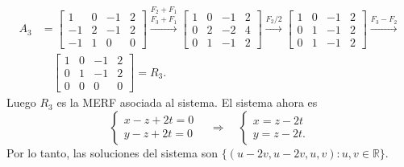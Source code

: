 \begin{enumerate}[topsep=6pt, itemsep=.4cm]
\begin{align*}
A_3 &= \begin{bmatrix}
 1&0&-1&2\\
 -1&2&-1&2\\
 -1&1&0&0\end{bmatrix} \stackrel{F_2+F_1}{\stackrel{F_3+F_1}{\longrightarrow}}   
 \begin{bmatrix}
 1&0&-1&2\\
 0&2&-2&4\\
 0&1&-1&2\end{bmatrix}{\stackrel{F_2/2}{\longrightarrow}}   
 \begin{bmatrix}
 1&0&-1&2\\
 0&1&-1&2\\
 0&1&-1&2\end{bmatrix}{\stackrel{F_3-F_2}{\longrightarrow}}  \\
 &\quad
 \begin{bmatrix}
 1&0&-1&2\\
 0&1&-1&2\\
 0&0&0&0\end{bmatrix} = R_3.
\end{align*}
Luego $R_3$ es la MERF asociada al sistema. El sistema ahora es 
\begin{equation*}
    \begin{cases}
 x - z + 2t = 0\\
 y - z + 2t = 0
\end{cases}
\quad \Rightarrow \quad
 \begin{cases}
 x = z - 2t \\
 y = z - 2t.
\end{cases}
\end{equation*}
Por lo tanto,  las soluciones del sistema son  $\{ (u -2v, u-2v,u,v): u,v\in \mathbb R \}$.



\end{enumerate}
